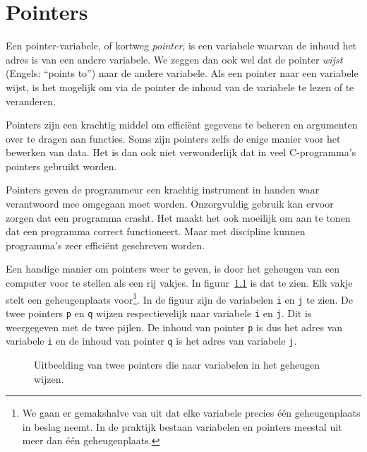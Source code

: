 \chapter{Pointers}
\label{cha:pointers}
\thispagestyle{empty}

Een pointer-variabele, of kortweg \textsl{pointer}, is een variabele waarvan de inhoud het adres is van een andere variabele. We zeggen dan ook wel dat de pointer \textsl{wijst} (Engels: ``points to'') naar de andere variabele. Als een pointer naar een variabele wijst, is het mogelijk om via de pointer de inhoud van de variabele te lezen of te veranderen.

Pointers zijn een krachtig middel om efficiënt gegevens te beheren en argumenten over te dragen aan functies. Soms zijn pointers zelfs de enige manier voor het bewerken van data. Het is dan ook niet verwonderlijk dat in veel C-programma's pointers gebruikt worden. 

Pointers geven de programmeur een krachtig instrument in handen waar verantwoord mee omgegaan moet worden.
Onzorgvuldig gebruik kan ervoor zorgen dat een programma crasht. Het maakt het ook moeilijk om aan te tonen dat een programma correct functioneert. Maar met discipline kunnen programma’s zeer efficiënt geschreven worden.

Een handige manier om pointers weer te geven, is door het geheugen van een computer voor te stellen als een rij vakjes. In figuur~\ref{fig:poiinmem} is dat te zien. Elk vakje stelt een geheugenplaats voor\footnote{We gaan er gemakshalve van uit dat elke variabele precies één geheugenplaats in beslag neemt. In de praktijk bestaan variabelen en pointers meestal uit meer dan één geheugenplaats.}. In de figuur zijn de variabelen \texttt{i} en \texttt{j} te zien. De twee pointers \texttt{p} en \texttt{q} wijzen respectievelijk naar variabele \texttt{i} en \texttt{j}. Dit is weergegeven met de twee pijlen. De inhoud van pointer \texttt{p} is dus het adres van variabele \texttt{i} en de inhoud van pointer \texttt{q} is het adres van variabele \texttt{j}.

\vspace*{-0.5\baselineskip}
\begin{figure}[!ht]
\centering
{}
\caption{Uitbeelding van twee pointers die naar variabelen in het geheugen wijzen.}
\label{fig:poiinmem}
\end{figure}


